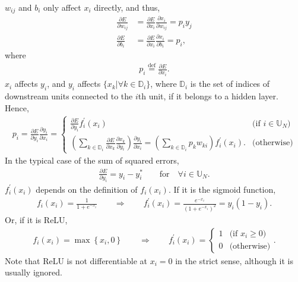 \documentclass{article}
\begin{document}
$w_{ij}$ and $b_{i}$ only affect $x_{i}$ directly, and thus,
\begin{align}
\frac{\partial E}{\partial w_{ij}}
&=
\frac{\partial E}{\partial x_{i}}
\frac{\partial x_{i}}{\partial w_{ij}}
=
p_{i}y_{j}
\\
\frac{\partial E}{\partial b_{i}}
&=
\frac{\partial E}{\partial x_{i}}
\frac{\partial x_{i}}{\partial b_{i}}
=
p_{i},
\end{align}
where
\begin{align}
p_{i}\overset{\mathrm{def}}{=}
\frac{\partial E}{\partial x_{i}}.
\end{align}
$x_{i}$ affects $y_{i}$,
and $y_{i}$ affects $\{x_{k}|\forall k\in\mathbb{D}_{i}\}$,
where $\mathbb{D}_{i}$ is the set of indices of downstream units connected to the $i$th unit,
if it belongs to a hidden layer.
Hence,
\begin{align}
p_{i}
=\frac{\partial E}{\partial y_{i}}\frac{\partial y_{i}}{\partial x_{i}}
=\begin{cases}
\frac{\partial E}{\partial y_{i}}f_{i}^{\prime}(x_{i})
& \mbox{(if $i\in\mathbb{U}_{N}$)}
\\
\left(\sum_{k\in\mathbb{D}_{i}}\frac{\partial E}{\partial x_{k}}\frac{\partial x_{k}}{\partial y_{i}}\right)
\frac{\partial y_{i}}{\partial x_{i}}
=\left(\sum_{k\in\mathbb{D}_{i}}p_{k}w_{ki}\right)f_{i}^{\prime}(x_{i}).
& \mbox{(otherwise)}
\end{cases}
\end{align}
In the typical case of the sum of squared errors,
\begin{align}
\frac{\partial E}{\partial y_{i}}
=y_{i}-y_{i}^{*}
\qquad\mbox{for}\quad
\forall i\in\mathbb{U}_{N}.
\end{align}
$f_{i}^{\prime}(x_{i})$ depends on the definition of $f_{i}(x_{i})$.
If it is the sigmoid function,
\begin{align}
f_{i}(x_{i})=\frac{1}{1+e^{-x_{i}}}
\qquad\Rightarrow\qquad
f_{i}^{\prime}(x_{i})=\frac{e^{-x_{i}}}{\left(1+e^{-x_{i}}\right)^{2}}=y_{i}\left(1-y_{i}\right).
\end{align}
Or, if it is ReLU,
\begin{align}
f_{i}(x_{i})=\max\left\{x_{i},0\right\}
\qquad\Rightarrow\qquad
f_{i}^{\prime}(x_{i})=\begin{cases}
1 & \mbox{(if $x_{i}\geq 0$)}
\\
0 & \mbox{(otherwise)}
\end{cases}.
\end{align}
Note that ReLU is not differentiable at $x_{i}=0$ in the strict sense,
although it is usually ignored.
\end{document}
